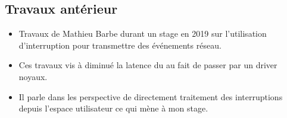 \subsection{Travaux antérieur}

\begin{itemize}
  \item Travaux de Mathieu Barbe durant un stage en 2019 sur l'utilisation d'interruption pour transmettre des événements réseau.
  \item Ces travaux vis à diminué la latence du au fait de passer par un driver noyaux.
  \item Il parle dans les perspective de directement traitement des interruptions depuis l'espace utilisateur ce qui mène à mon stage.
\end{itemize}
